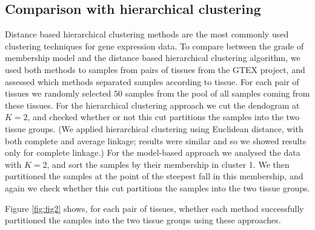 \subsection{Comparison with hierarchical clustering}

Distance based hierarchical clustering methods are the most commonly used clustering techniques for gene expression data. To compare between the grade of membership model and the distance based hierarchical clustering algorithm, we used both methods to samples from pairs of tissues from the GTEX project, and assessed 
which methods separated samples according to tissue.  For each pair of tissues  we randomly selected $50$ samples from the pool of all samples coming from these tissues. 
For the hierarchical clustering approach we cut the dendogram at $K=2$, and checked whether or not this cut partitions the samples into the two tissue groups. 
(We applied hierarchical clustering using Euclidean distance, with both complete and average linkage; results were similar and so we showed results only for complete linkage.) 
For the model-based approach we analysed the data with $K=2$, and sort the samples by their membership in cluster 1. We then partitioned the samples at the point of the steepest fall in this membership, and again we check whether this cut partitions the samples into the two tissue groups.

Figure \ref{fig:fig2} shows, for each pair of tissues, whether each method successfully partitioned the samples into the two tissue groups using these approaches.
%























 









